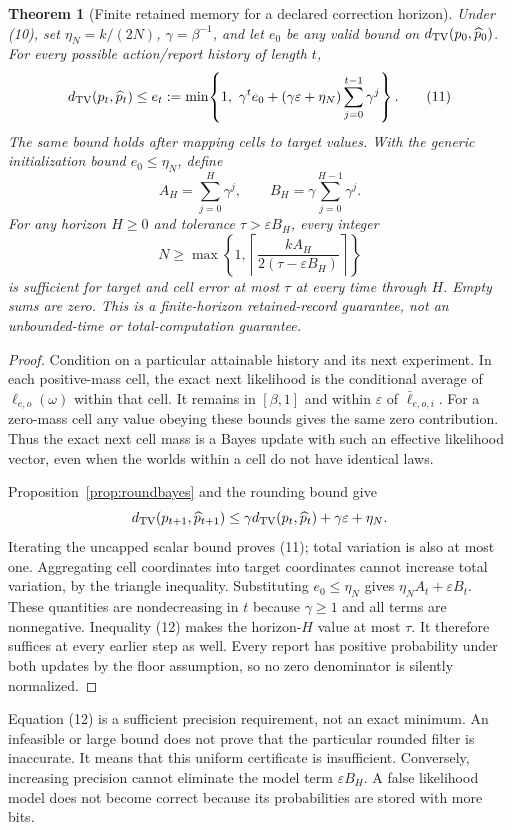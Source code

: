 \documentclass[11pt,letterpaper]{article}
\theoremstyle{plain}
\newtheorem{theorem}{Theorem}[section]
\theoremstyle{definition}
\begin{document}
\begin{theorem}[Finite retained memory for a declared correction horizon]\label{thm:finiteprecision}
Under (10), set $\eta_N=k/(2N)$, $\gamma=\beta^{-1}$, and let $e_0$ be any valid bound on $d_{\mathrm{TV}}(p_0,\widehat p_0)$. For every possible action/report history of length $t$,
\[
 d_{\mathrm{TV}}(p_t,\widehat p_t)\le e_t
 :=\min\!\left\{1,\ \gamma^t e_0+(\gamma\varepsilon+\eta_N)
                         \sum_{j=0}^{t-1}\gamma^j\right\}. \tag{11}
\]
The same bound holds after mapping cells to target values. With the generic initialization bound $e_0\le\eta_N$, define
\[
 A_H=\sum_{j=0}^{H}\gamma^j,\qquad
 B_H=\gamma\sum_{j=0}^{H-1}\gamma^j.
\]
For any horizon $H\ge0$ and tolerance $\tau>\varepsilon B_H$, every integer
\[
 N\ge \max\!\left\{1,\left\lceil
       \frac{kA_H}{2(\tau-\varepsilon B_H)}\right\rceil\right\} \tag{12}
\]
is sufficient for target and cell error at most $\tau$ at every time through $H$. Empty sums are zero. This is a finite-horizon retained-record guarantee, not an unbounded-time or total-computation guarantee.
\end{theorem}
\begin{proof}
Condition on a particular attainable history and its next experiment. In each positive-mass cell, the exact next likelihood is the conditional average of $\ell_{e,o}(\omega)$ within that cell. It remains in $[\beta,1]$ and within $\varepsilon$ of $\bar\ell_{e,o,i}$. For a zero-mass cell any value obeying these bounds gives the same zero contribution. Thus the exact next cell mass is a Bayes update with such an effective likelihood vector, even when the worlds within a cell do not have identical laws.

Proposition~\ref{prop:roundbayes} and the rounding bound give
\[
 d_{\mathrm{TV}}(p_{t+1},\widehat p_{t+1})
 \le\gamma d_{\mathrm{TV}}(p_t,\widehat p_t)+\gamma\varepsilon+\eta_N.
\]
Iterating the uncapped scalar bound proves (11); total variation is also at most one. Aggregating cell coordinates into target coordinates cannot increase total variation, by the triangle inequality. Substituting $e_0\le\eta_N$ gives $\eta_N A_t+\varepsilon B_t$. These quantities are nondecreasing in $t$ because $\gamma\ge1$ and all terms are nonnegative. Inequality (12) makes the horizon-$H$ value at most $\tau$. It therefore suffices at every earlier step as well. Every report has positive probability under both updates by the floor assumption, so no zero denominator is silently normalized.
\end{proof}

Equation (12) is a sufficient precision requirement, not an exact minimum. An infeasible or large bound does not prove that the particular rounded filter is inaccurate. It means that this uniform certificate is insufficient. Conversely, increasing precision cannot eliminate the model term $\varepsilon B_H$. A false likelihood model does not become correct because its probabilities are stored with more bits.
\end{document}
